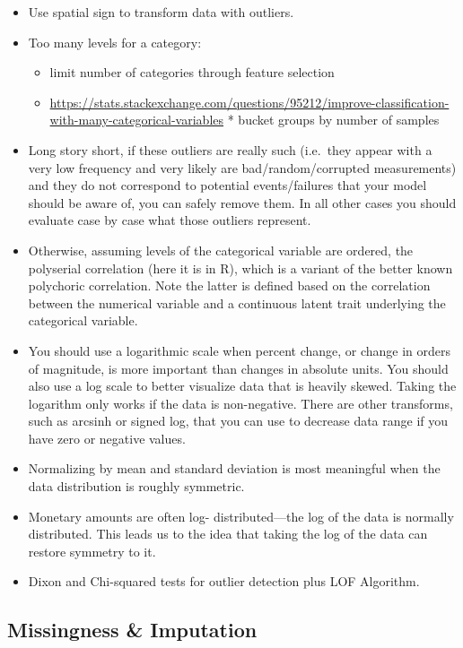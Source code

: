 \documentclass[]{book}
\providecommand{\tightlist}{%
  \setlength{\itemsep}{0pt}\setlength{\parskip}{0pt}}
\begin{document}
\begin{itemize}
\item
  Use spatial sign to transform data with outliers.
\item
  Too many levels for a category:

  \begin{itemize}
  \tightlist
  \item
    limit number of categories through feature selection
  \item
    \url{https://stats.stackexchange.com/questions/95212/improve-classification-with-many-categorical-variables}
    * bucket groups by number of samples
  \end{itemize}
\item
  Long story short, if these outliers are really such (i.e.~they appear
  with a very low frequency and very likely are bad/random/corrupted
  measurements) and they do not correspond to potential events/failures
  that your model should be aware of, you can safely remove them. In all
  other cases you should evaluate case by case what those outliers
  represent.
\item
  Otherwise, assuming levels of the categorical variable are ordered,
  the polyserial correlation (here it is in R), which is a variant of
  the better known polychoric correlation. Note the latter is defined
  based on the correlation between the numerical variable and a
  continuous latent trait underlying the categorical variable.
\item
  You should use a logarithmic scale when percent change, or change in
  orders of magnitude, is more important than changes in absolute units.
  You should also use a log scale to better visualize data that is
  heavily skewed. Taking the logarithm only works if the data is
  non-negative. There are other transforms, such as arcsinh or signed
  log, that you can use to decrease data range if you have zero or
  negative values.
\item
  Normalizing by mean and standard deviation is most meaningful when the
  data distribution is roughly symmetric.
\item
  Monetary amounts are often log- distributed---the log of the data is
  normally distributed. This leads us to the idea that taking the log of
  the data can restore symmetry to it.
\item
  Dixon and Chi-squared tests for outlier detection plus LOF Algorithm.
\end{itemize}

\subsection{Missingness \& Imputation}\label{missingness-imputation}
\end{document}

